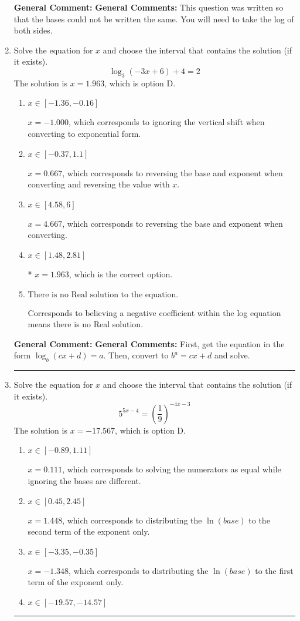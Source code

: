 \documentclass{extbook}[14pt]
\newcommand{\litem}[1]{\item #1

\rule{\textwidth}{0.4pt}}
\begin{document}
\begin{enumerate}
{\textbf{General Comment:} \textbf{General Comments:} This question was written so that the bases could not be written the same. You will need to take the log of both sides.
}
\litem{
Solve the equation for $x$ and choose the interval that contains the solution (if it exists).
\[ \log_{3}{(-3x+6)}+4 = 2 \]The solution is \( x = 1.963 \), which is option D.\begin{enumerate}[label=\Alph*.]
\item \( x \in [-1.36, -0.16] \)

$x = -1.000$, which corresponds to ignoring the vertical shift when converting to exponential form.
\item \( x \in [-0.37, 1.1] \)

$x = 0.667$, which corresponds to reversing the base and exponent when converting and reversing the value with $x$.
\item \( x \in [4.58, 6] \)

$x = 4.667$, which corresponds to reversing the base and exponent when converting.
\item \( x \in [1.48, 2.81] \)

* $x = 1.963$, which is the correct option.
\item \( \text{There is no Real solution to the equation.} \)

Corresponds to believing a negative coefficient within the log equation means there is no Real solution.
\end{enumerate}

\textbf{General Comment:} \textbf{General Comments:} First, get the equation in the form $\log_b{(cx+d)} = a$. Then, convert to $b^a = cx+d$ and solve.
}
\litem{
Solve the equation for $x$ and choose the interval that contains the solution (if it exists).
\[ 5^{5x-4} = \left(\frac{1}{9}\right)^{-4x-3} \]The solution is \( x = -17.567 \), which is option D.\begin{enumerate}[label=\Alph*.]
\item \( x \in [-0.89, 1.11] \)

$x = 0.111$, which corresponds to solving the numerators as equal while ignoring the bases are different.
\item \( x \in [0.45, 2.45] \)

$x = 1.448$, which corresponds to distributing the $\ln(base)$ to the second term of the exponent only.
\item \( x \in [-3.35, -0.35] \)

$x = -1.348$, which corresponds to distributing the $\ln(base)$ to the first term of the exponent only.
\item \( x \in [-19.57, -14.57] \)


\end{enumerate}}
\end{enumerate}
\end{document}
